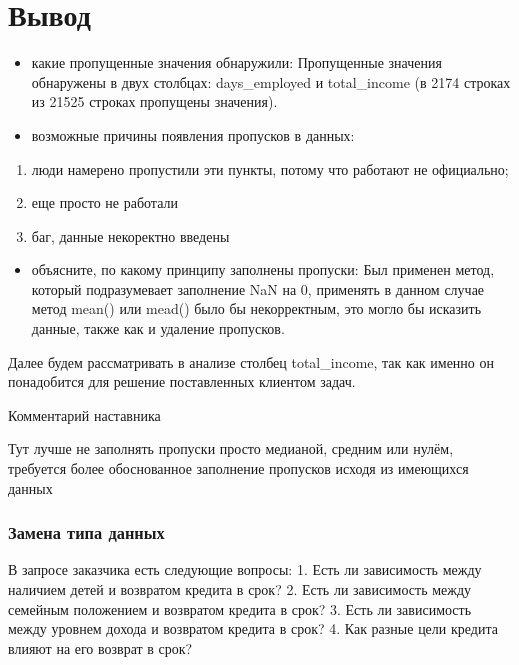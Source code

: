 \documentclass[11pt]{article}
\providecommand{\tightlist}{%
      \setlength{\itemsep}{0pt}\setlength{\parskip}{0pt}}
\begin{document}
    \hypertarget{ux432ux44bux432ux43eux434}{%
\section{Вывод}\label{ux432ux44bux432ux43eux434}}

\begin{itemize}
\item
  какие пропущенные значения обнаружили: Пропущенные значения обнаружены
  в двух столбцах: days\_employed и total\_income (в 2174 строках из
  21525 строках пропущены значения).
\item
  возможные причины появления пропусков в данных:
\end{itemize}

\begin{enumerate}
\def\labelenumi{\arabic{enumi}.}
\tightlist
\item
  люди намерено пропустили эти пункты, потому что работают не
  официально;
\item
  еще просто не работали
\item
  баг, данные некоректно введены
\end{enumerate}

\begin{itemize}
\tightlist
\item
  объясните, по какому принципу заполнены пропуски: Был применен метод,
  который подразумевает заполнение NaN на 0, применять в данном случае
  метод mean() или mead() было бы некорректным, это могло бы исказить
  данные, также как и удаление пропусков.
\end{itemize}

    Далее будем рассматривать в анализе столбец total\_income, так как
именно он понадобится для решение поставленных клиентом задач.

    Комментарий наставника

Тут лучше не заполнять пропуски просто медианой, средним или нулём,
требуется более обоснованное заполнение пропусков исходя из имеющихся
данных

    \hypertarget{ux437ux430ux43cux435ux43dux430-ux442ux438ux43fux430-ux434ux430ux43dux43dux44bux445}{%
\subsubsection{Замена типа
данных}\label{ux437ux430ux43cux435ux43dux430-ux442ux438ux43fux430-ux434ux430ux43dux43dux44bux445}}

    В запросе заказчика есть следующие вопросы: 1. Есть ли зависимость между
наличием детей и возвратом кредита в срок? 2. Есть ли зависимость между
семейным положением и возвратом кредита в срок? 3. Есть ли зависимость
между уровнем дохода и возвратом кредита в срок? 4. Как разные цели
кредита влияют на его возврат в срок?
\end{document}
